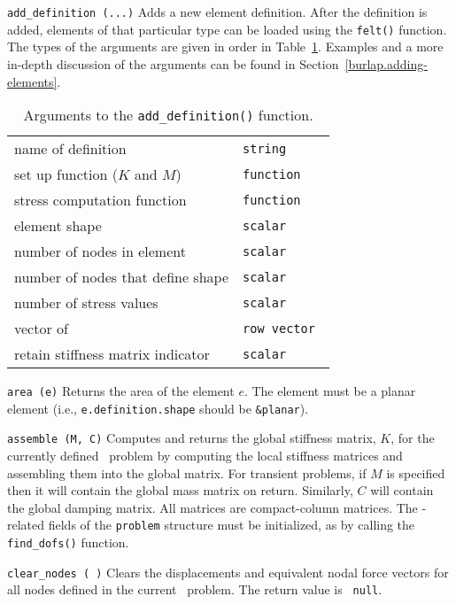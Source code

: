 \begin{dispitems}
\item[\tt add\_definition (...)]
Adds a new element definition.  After the definition is added,
elements of that particular type can be loaded using the {\tt felt()}
function.  The types of the arguments are given in order in
Table~\ref{burlap.add-def.args}.  Examples and a more in-depth discussion
of the arguments can be found in Section~\ref{burlap.adding-elements}.

\begin{table}[htbp]
\centering
\begin{tabular}{ll}
name of definition		  & \tt string	   \\
set up function ($K$ and $M$)	  & \tt function   \\
stress computation function	  & \tt function   \\
element shape			  & \tt scalar	   \\
number of nodes in element	  & \tt scalar	   \\
number of nodes that define shape & \tt scalar	   \\
number of stress values		  & \tt scalar	   \\
vector of \dofs			  & \tt row vector \\
retain stiffness matrix indicator & \tt scalar	   \\
\end{tabular}
\caption{Arguments to the {\tt add\_definition()} function.}
\label{burlap.add-def.args}
\end{table}

\item[\tt area (e)]
Returns the area of the element $e$.  The element must be a planar
element (i.e., {\tt e.definition.shape} should be {\tt \&planar}).

\item[\tt assemble (M, C)]
Computes and returns the global stiffness matrix, $K$, for the
currently defined \felt\ problem by computing the local stiffness
matrices and assembling them into the global matrix.  For transient
problems, if $M$ is specified then it will contain the global mass
matrix on return.  Similarly, $C$ will contain the global damping
matrix.  All matrices are compact-column matrices.  The \dof-related
fields of the {\tt problem} structure must be initialized, as by
calling the {\tt find\_dofs()} function.

\item[\tt clear\_nodes ( )]
Clears the displacements and equivalent nodal force vectors for all
nodes defined in the current \felt\ problem.  The return value is {\tt
null}.


\end{dispitems}
